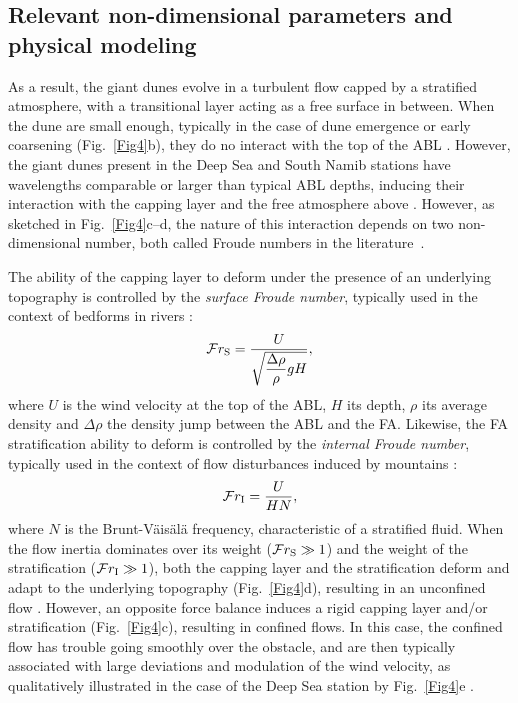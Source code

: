   \subsection{Relevant non-dimensional parameters and physical modeling}
  \label{theoretical_framework}

  As a result, the giant dunes evolve in a turbulent flow capped by a stratified atmosphere, with a transitional layer acting as a free surface in between. When the dune are small enough, typically in the case of dune emergence or early coarsening (Fig.~\ref{Fig4}b), they do no interact with the top of the ABL \citep{Fourriere2010}. However, the giant dunes present in the Deep Sea and South Namib stations have wavelengths comparable or larger than typical ABL depths, inducing their interaction with the capping layer and the free atmosphere above \citep{andreotti2009}. However, as sketched in Fig.~\ref{Fig4}c--d, the nature of this interaction depends on two non-dimensional number, both called Froude numbers in the literature~\citep{Vosper2004, Sheridan2006, Hunt2006, Jiang2014}.

  The ability of the capping layer to deform under the presence of an underlying topography is controlled by the \emph{surface Froude number}, typically used in the context of bedforms in rivers \citep{Fourriere2010, Andreotti2012}:
  \begin{equation}
    \mathcal{F}r_{\textup{S}} = \displaystyle\frac{U}{\sqrt{\displaystyle\frac{\Delta\rho}{\rho}gH}},
  \end{equation}
  where $U$ is the wind velocity at the top of the ABL, $H$ its depth, $\rho$ its average density and $\Delta\rho$ the density jump between the ABL and the FA.
  Likewise, the FA stratification ability to deform is controlled by the \emph{internal Froude number}, typically used in the context of flow disturbances induced by mountains \citep{Stull1988}:
  \begin{equation}
    \mathcal{F}r_{\textup{I}} = \displaystyle\frac{U}{H N},
  \end{equation}
  where $N$ is the Brunt-Väisälä frequency, characteristic of a stratified fluid.
  When the flow inertia dominates over its weight ($\mathcal{F}r_{\textup{S}} \gg 1$) and the weight of the stratification ($\mathcal{F}r_{\textup{I}} \gg 1$), both the capping layer and the stratification deform and adapt to the underlying topography (Fig.~\ref{Fig4}d), resulting in an unconfined flow \citep{refs}. However, an opposite force balance induces a rigid capping layer and/or stratification (Fig.~\ref{Fig4}c), resulting in confined flows. In this case, the confined flow has trouble going smoothly over the obstacle, and are then typically associated with large deviations and modulation of the wind velocity, as qualitatively illustrated in the case of the Deep Sea station by Fig.~\ref{Fig4}e \citep{refs}.

